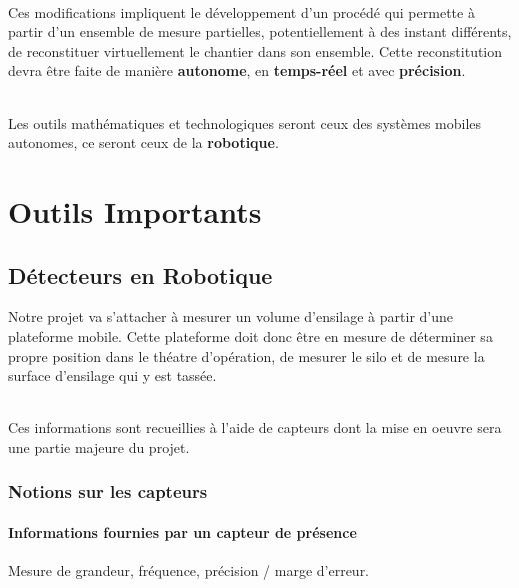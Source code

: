 \documentclass[12pt,a4paper]{report}
\begin{document}
\paragraph{}Ces modifications impliquent le développement d'un procédé qui permette à partir d'un ensemble de mesure partielles, potentiellement à des instant différents, de reconstituer virtuellement le chantier dans son ensemble. Cette reconstitution devra être faite de manière \textbf{autonome}, en \textbf{temps-réel} et avec \textbf{précision}.

\paragraph{}Les outils mathématiques et technologiques seront ceux des systèmes mobiles autonomes, ce seront ceux de la \textbf{robotique}.






\part{Outils Importants }

\chapter{Détecteurs en Robotique}

Notre projet va s'attacher à mesurer un volume d'ensilage à partir d'une plateforme mobile. Cette plateforme doit donc être en mesure de déterminer sa propre position dans le théatre d'opération, de mesurer le silo et de mesure la surface d'ensilage qui y est tassée.

\paragraph{} Ces informations sont recueillies à l'aide de capteurs dont la mise en oeuvre sera une partie majeure du projet.

\section{Notions sur les capteurs}

\subsection{Informations fournies par un capteur de présence}

Mesure de grandeur, fréquence, précision / marge d'erreur.
\end{document}
